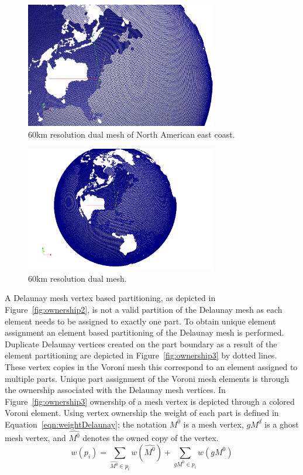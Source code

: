 \documentclass[a4paper]{article}
\begin{document}
\begin{figure}
\centering
\includegraphics[width=0.75\textwidth]{ocean_QU_60kmNA_eastCoastZoom.png}
\caption{\label{fig:east60} 60km resolution dual mesh of North American east coast.}
\end{figure}

\begin{figure}
\centering
\includegraphics[width=0.75\textwidth]{ocean_QU_60kmNA_far.png}
\caption{\label{fig:NA60}60km resolution dual mesh.}
\end{figure}

A Delaunay mesh vertex based partitioning, as depicted in Figure~\ref{fig:ownership2}, is not a valid partition of the Delaunay mesh as each element needs to be assigned to exactly one part.  To obtain unique element assignment an element based partitioning of the Delaunay mesh is performed.  Duplicate Delaunay vertices created on the part boundary as a result of the element partitioning are depicted in Figure~\ref{fig:ownership3} by dotted lines.  These vertex copies in the Voroni mesh this correspond to an element assigned to multiple parts.  Unique part assignment of the Voroni mesh elements is through the ownership associated with the Delaunay mesh vertices.  In Figure~\ref{fig:ownership3} ownership of a mesh vertex is depicted through a colored Voroni element.  Using vertex ownership the weight of each part is defined in Equation~\ref{eqn:weightDelaunay}; the notation $M^0$ is a mesh vertex, $gM^d$ is a ghost mesh vertex, and $\hat{M^0}$ denotes the owned copy of the vertex.
\begin{equation}
\label{eqn:weightDelaunay}
w(p_i) = \sum_{\hat{M^0} \in p_i}w(\hat{M^0}) + \sum_{gM^0 \in p_i}w(gM^0)
\end{equation}
\end{document}
